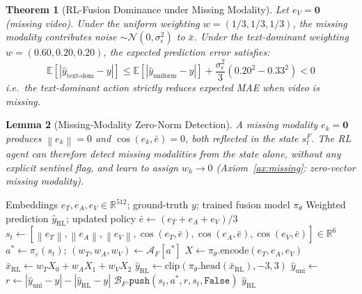 \documentclass[12pt,a4paper]{article}
\theoremstyle{definition}
\theoremstyle{plain}
\newtheorem{theorem}{Theorem}[section]
\newtheorem{lemma}[theorem]{Lemma}
\theoremstyle{remark}
\newcommand{\R}{\mathbb{R}}
\newcommand{\Norm}[1]{\left\|#1\right\|}
\newcommand{\EE}{\mathbb{E}}
\begin{document}
\begin{theorem}[RL-Fusion Dominance under Missing Modality]
\label{thm:fusion_dom}
Let $e_V = \mathbf{0}$ (missing video). Under the uniform weighting
$w=(1/3,1/3,1/3)$, the missing modality contributes noise
$\sim \mathcal{N}(0,\sigma_\epsilon^2)$ to $\bar{x}$. Under the text-dominant
weighting $w=(0.60,0.20,0.20)$, the expected prediction error satisfies:
\[
  \EE[|\hat{y}_{\text{text-dom}} - y|]
  \le \EE[|\hat{y}_{\text{uniform}} - y|]
  + \frac{\sigma_\epsilon^2}{3}\left(0.20^2 - 0.33^2\right) < 0
\]
i.e.\ the text-dominant action strictly reduces expected MAE when video is missing.
\end{theorem}

\begin{lemma}[Missing-Modality Zero-Norm Detection]
\label{lem:zero_norm}
A missing modality $e_k = \mathbf{0}$ produces $\Norm{e_k} = 0$ and
$\cos(e_k,\bar{e}) = 0$, both reflected in the state $s_t^F$.
The RL agent can therefore detect missing modalities from the state alone,
without any explicit sentinel flag, and learn to assign $w_k \to 0$
(Axiom~\ref{ax:missing}: zero-vector missing modality).
\end{lemma}

\begin{algorithm}[H]
\caption{RL-Fusion Policy --- Weighted Prediction and Feedback}
\label{alg:rl_fusion}
\begin{algorithmic}[1]
\Require Embeddings $e_T, e_A, e_V \in \R^{512}$; ground-truth $y$;
         trained fusion model $\pi_\theta$
\Ensure Weighted prediction $\hat{y}_{\text{RL}}$; updated policy
\State $\bar{e} \gets (e_T + e_A + e_V)/3$
\State $s_t \gets [\Norm{e_T},\Norm{e_A},\Norm{e_V},
       \cos(e_T,\bar{e}),\cos(e_A,\bar{e}),\cos(e_V,\bar{e})] \in \R^6$
\State $a^* \gets \pi_\varepsilon(s_t)$;
       \quad $(w_T,w_A,w_V) \gets \mathcal{A}_F[a^*]$
\State $X \gets \pi_\theta.\text{encode}(e_T,e_A,e_V)$
\State $\bar{x}_{\text{RL}} \gets w_T X_0 + w_A X_1 + w_V X_2$
\State $\hat{y}_{\text{RL}} \gets \text{clip}(\pi_\theta.\text{head}(\bar{x}_{\text{RL}}),{-3},{3})$
\State $\hat{y}_{\text{uni}} \gets$ 
\State $r \gets |\hat{y}_{\text{uni}}-y| - |\hat{y}_{\text{RL}}-y|$
\State $\mathcal{B}_F.\texttt{push}(s_t,a^*,r,s_t,\texttt{False})$
\State {}
\State \Return $\hat{y}_{\text{RL}}$
\end{algorithmic}
\end{algorithm}
\end{document}
